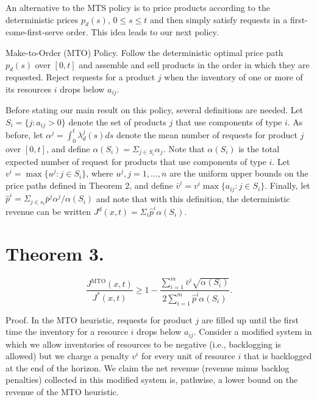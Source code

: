 An alternative to the MTS policy is to price products according to the deterministic prices \(p_d(s)\), \(0 \leqslant s \leqslant t\) and then simply satisfy requests in a first-come-first-serve order. This idea leads to our next policy.

Make-to-Order (MTO) Policy. Follow the deterministic optimal price path \(p_d(s)\) over \([0, t]\) and assemble and sell products in the order in which they are requested. Reject requests for a product \(j\) when the inventory of one or more of its resources \(i\) drops below \(a_{ij}\).

Before stating our main result on this policy, several definitions are needed. Let \(S_i = \{ j \colon a_{ij} > 0 \}\) denote the set of products \(j\) that use components of type \(i\). As before, let \(\alpha^j = \int_{0}^{t} \lambda_d^j(s)  ds\) denote the mean number of requests for product \(j\) over \([0, t]\), and define \(\alpha(S_i) = \Sigma_{j \in S_i} \alpha_j\). Note that \(\alpha(S_i)\) is the total expected number of request for products that use components of type \(i\). Let \(v^i = \operatorname*{max} \{ u^j \colon j \in S_i \}\), where \(u^j, j = 1, \ldots, n\) are the uniform upper bounds on the price paths defined in Theorem 2, and define \(\bar{v}^i = v^i \operatorname*{max} \{ a_{ij} \colon j \in S_i \}\). Finally, let \(\hat{p}^i = \Sigma_{j \in s_i} \bar{p}^j \alpha^j / \alpha(S_i)\) and note that with this definition, the deterministic revenue can be written \(J^{d}(x, t) = \Sigma_i \hat{p}^i \alpha(S_i)\).

\section{Theorem 3.}\label{theorem-3.}
\[
\frac{J^{\mathrm{MTO}}(x, t)}{J^{*}(x, t)} \geqslant 1 - \frac{ \sum_{i=1}^{m} \bar{v}^i \sqrt{\alpha(S_i)} }{ 2 \sum_{i=1}^{m} \hat{p}^i \alpha(S_i) } .
\]

Proof. In the MTO heuristic, requests for product \(j\) are filled up until the first time the inventory for a resource \(i\) drops below \(a_{ij}\). Consider a modified system in which we allow inventories of resources to be negative (i.e., backlogging is allowed) but we charge a penalty \(v^i\) for every unit of resource \(i\) that is backlogged at the end of the horizon. We claim the net revenue (revenue minus backlog penalties) collected in this modified system is, pathwise, a lower bound on the revenue of the MTO heuristic.

